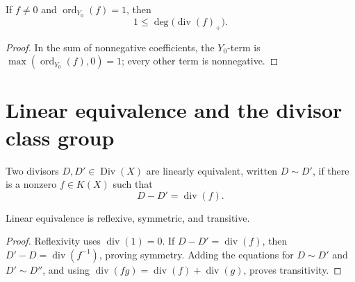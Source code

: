 \begin{lemma}
  \label{mk-lem:one_le_degree_positivePart_principal_of_order_one}
  \leanok


  If \(f\neq0\) and \(\operatorname{ord}_{Y_0}(f)=1\), then
  \[
    1\leq\deg\bigl(\operatorname{div}(f)_+\bigr).
  \]
\end{lemma}
\begin{proof}
  \leanok
  In the sum of nonnegative coefficients, the \(Y_0\)-term is
  \(\max(\operatorname{ord}_{Y_0}(f),0)=1\); every other term is
  nonnegative.
\end{proof}

\section{Linear equivalence and the divisor class group}

\begin{definition}
  \label{mk-def:linear_equivalence}
  \leanok


  Two divisors \(D,D'\in\operatorname{Div}(X)\) are linearly equivalent,
  written \(D\sim D'\), if there is a nonzero \(f\in K(X)\) such that
  \[
    D-D'=\operatorname{div}(f).
  \]
\end{definition}

\begin{lemma}
  \label{mk-lem:linear_equivalence_equivalence}
  Linear equivalence is reflexive, symmetric, and transitive.
\end{lemma}
\begin{proof}
  Reflexivity uses \(\operatorname{div}(1)=0\).  If
  \(D-D'=\operatorname{div}(f)\), then
  \(D'-D=\operatorname{div}(f^{-1})\), proving symmetry.  Adding the
  equations for \(D\sim D'\) and \(D'\sim D''\), and using
  \(\operatorname{div}(fg)=\operatorname{div}(f)+\operatorname{div}(g)\),
  proves transitivity.
\end{proof}

